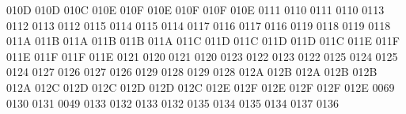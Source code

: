\setcclcuc 010D 010D 010C %
\setcclcuc 010E 010F 010E %
\setcclcuc 010F 010F 010E %
 0111 0110 %
 0111 0110 %
 0113 0112 %
 0113 0112 %
 0115 0114 %
 0115 0114 %
 0117 0116 %
 0117 0116 %
 0119 0118 %
 0119 0118 %
\setcclcuc 011A 011B 011A %
\setcclcuc 011B 011B 011A %
\setcclcuc 011C 011D 011C %
\setcclcuc 011D 011D 011C %
\setcclcuc 011E 011F 011E %
\setcclcuc 011F 011F 011E %
 0121 0120 %
 0121 0120 %
 0123 0122 %
 0123 0122 %
 0125 0124 %
 0125 0124 %
 0127 0126 %
 0127 0126 %
 0129 0128 %
 0129 0128 %
\setcclcuc 012A 012B 012A %
\setcclcuc 012B 012B 012A %
\setcclcuc 012C 012D 012C %
\setcclcuc 012D 012D 012C %
\setcclcuc 012E 012F 012E %
\setcclcuc 012F 012F 012E %
 0069 0130 %
 0131 0049 %
 0133 0132 %
 0133 0132 %
 0135 0134 %
 0135 0134 %
 0137 0136 %
